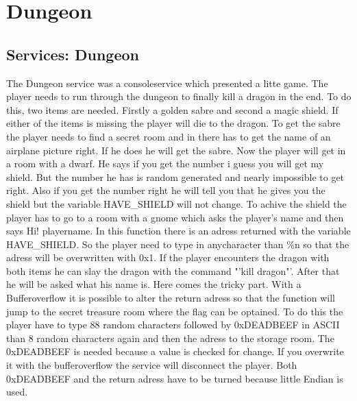 \chapter{Dungeon}


\section{Services: Dungeon}
The Dungeon service was a consoleservice which presented a litte game. The player needs to run through the dungeon to finally kill a dragon in the end. To do this, two items are needed. Firstly a golden sabre and second a magic shield. If either of the items is missing the player will die to the dragon.
To get the sabre the player needs to find a secret room and in there has to get the name of an airplane picture right. If he does he will get the sabre. 
Now the player will get in a room with a dwarf. He says if you get the number i guess you will get my shield. But the number he has is random generated and nearly impossible to get right. Also if you get the number right he will tell you that he gives you the shield but the variable HAVE\_SHIELD will not change. To achive the shield the player has to go to a room with a gnome which asks the player's name and then says Hi! playername. In this function there is an adress returned with the variable HAVE\_SHIELD. So the player need to type in anycharacter than \%n so that the adress will be overwritten with 0x1.
If the player encounters the dragon with both items he can slay the dragon with the command "'kill dragon"'. After that he will be asked what his name is. Here comes the tricky part. With a Bufferoverflow it is possible to alter the return adress so that the function will jump to the secret treasure room where the flag can be optained. To do this the player have to type 88 random characters followed by 0xDEADBEEF in ASCII than 8 random characters again and then the adress to the storage room. The 0xDEADBEEF is needed because a value is checked for change. If you overwrite it with the bufferoverflow the service will disconnect the player. Both 0xDEADBEEF and the return adress have to be turned because little Endian is used. 


